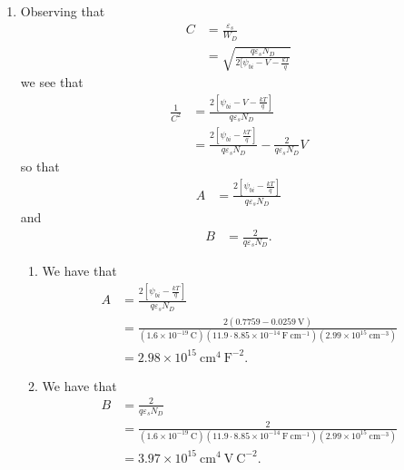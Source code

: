 \documentclass{article}
\begin{document}
\begin{enumerate}
\item{ 
  Observing that
  \begin{align*}
    C &= \frac{\varepsilon_s}{W_D} \\
      &= \sqrt{\frac{q \varepsilon_s N_D}
                      {2[\psi_{bi} - V - \frac{kT}{q}}} 
  \end{align*}
  we see that
  \begin{align*}
    \frac{1}{C^2} &= \frac{2\left[\psi_{bi} - V - \frac{kT}{q}\right]}
                          {q \varepsilon_s N_D} \\
                  &= \frac{2\left[\psi_{bi} - \frac{kT}{q}\right]}
                          {q \varepsilon_s N_D}
                   - \frac{2}{q \varepsilon_s N_D} V
  \end{align*}
  so that
  \begin{align*}
    A &= \frac{2\left[\psi_{bi} - \frac{kT}{q}\right]}
              {q \varepsilon_s N_D}
  \end{align*}
  and
  \begin{align*}
    B &= \frac{2}{q \varepsilon_s N_D}.
  \end{align*}
  \begin{enumerate}
    \item{We have that 
          \begin{align*}
          A &= \frac{2\left[\psi_{bi} - \frac{kT}{q}\right]}
                    {q \varepsilon_s N_D} \\
            &= \frac{2(0.7759 - 0.0259 ~\mathrm{V})}
                    {(1.6 \times 10^{-19} ~\mathrm{C})
                     (11.9 \cdot 8.85 \times 10^{-14} ~\mathrm{F}~\mathrm{cm}^{-1})
                     (2.99 \times 10^{15} ~\mathrm{cm}^{-3})} \\
            &= 2.98 \times 10^{15} ~\mathrm{cm}^4 ~\mathrm{F}^{-2}. 
          \end{align*}
         }
    \item{We have that
          \begin{align*}
          B &= \frac{2}{q \varepsilon_s N_D} \\
            &= \frac{2}{(1.6 \times 10^{-19} ~\mathrm{C})
                        (11.9 \cdot 8.85 \times 10^{-14} ~\mathrm{F}~\mathrm{cm}^{-1})
                        (2.99 \times 10^{15} ~\mathrm{cm}^{-3})} \\
            &= 3.97 \times 10^{15}~\mathrm{cm}^4 ~\mathrm{V} ~\mathrm{C}^{-2}.
          \end{align*}
         }
  \end{enumerate}
}

\end{enumerate}
\end{document}
